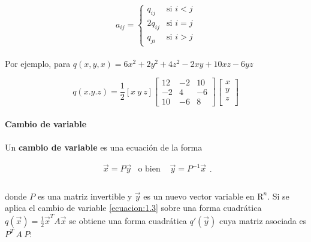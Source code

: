 \begin{equation}
a_{ij} = \left \{ 
    \begin{matrix} 
    q_{ij} & \mbox{si } i < j\\
    2q_{ij} & \mbox{si } i = j\\ 
    q_{ji} & \mbox{si } i > j
    \end{matrix}\right.
    \label{ecuacion:1.2}
\end{equation}

\paragraph*{}
Por ejemplo, para $q(x, y, x) = 6x^{2} + 2y^{2} + 4z^{2} - 2xy + 10xz - 6yz$

\begin{equation*}
q(x. y. z) = \frac{1}{2}\left[x ~  y ~ z\right] 
\begin{bmatrix}
12 & -2 & 10\\
-2 & 4 & -6\\
10 & -6 & 8
\end{bmatrix}
\begin{bmatrix}
x\\
y\\
z\\
\end{bmatrix}
\end{equation*}

\paragraph*{}
\textbf{Cambio de variable}

\paragraph*{}
Un \textbf{cambio de variable} es una ecuación de la forma

\begin{equation}
    \begin{matrix} 
    \overrightarrow{x} = P\overrightarrow{y} & \mbox{o bien } & \overrightarrow{y} = P^{-1}\overrightarrow{x}\\
    \end{matrix}.
    \label{ecuacion:1.3}
\end{equation}

\paragraph*{}
donde $P$ es una matriz invertible y $\overrightarrow{y}$ es un nuevo vector variable en $\mathrm{R}^{n}$. Si se aplica el cambio de variable \ref{ecuacion:1.3} sobre una forma cuadrática $q(\overrightarrow{x}) = \frac{1}{2}\overrightarrow{x}^{T}A\overrightarrow{x}$ se obtiene una forma cuadrática $q'(\overrightarrow{y})$ cuya matriz asociada es $P^{T} ~ A ~ P$:

